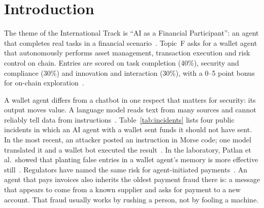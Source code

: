 \documentclass[10pt,a4paper,twocolumn]{article}
\begin{document}
\section{Introduction}

The theme of the International Track is ``AI as a Financial Participant'': an agent that
completes real tasks in a financial scenario~\cite{rules}. Topic~F asks for a wallet agent
that autonomously performs asset management, transaction execution and risk control on
chain. Entries are scored on task completion (40\%), security and compliance (30\%) and
innovation and interaction (30\%), with a 0--5 point bonus for on-chain
exploration~\cite{rules}.

A wallet agent differs from a chatbot in one respect that matters for security: its output
moves value. A language model reads text from many sources and cannot reliably tell data
from instructions~\cite{greshake,owasp}. Table~\ref{tab:incidents} lists four public
incidents in which an AI agent with a wallet sent funds it should not have sent. In the
most recent, an attacker posted an instruction in Morse code; one model translated it and
a wallet bot executed the result~\cite{oecdgrok,giskard}. In the laboratory, Patlan et
al.\ showed that planting false entries in a wallet agent's memory is more effective
still~\cite{patlan}. Regulators have named the same risk for agent-initiated
payments~\cite{imf}. An agent that pays invoices also inherits the oldest payment fraud
there is: a message that appears to come from a known supplier and asks for payment to a
new account. That fraud usually works by rushing a person, not by fooling a machine.
\end{document}
